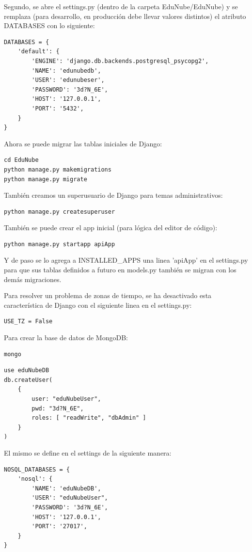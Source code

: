 Segundo, se abre el settings.py (dentro de la carpeta EduNube/EduNube) y se remplaza (para desarrollo, en producción debe llevar valores distintos) el atributo DATABASES con lo siguiente:
\lstset{language=Python}
\begin{lstlisting}
DATABASES = {
    'default': {
        'ENGINE': 'django.db.backends.postgresql_psycopg2',
        'NAME': 'edunubedb',
        'USER': 'edunubeser',
        'PASSWORD': '3d?N_6E',
        'HOST': '127.0.0.1',
        'PORT': '5432',
    }
}
\end{lstlisting}
\lstset{language=Bash}

Ahora se puede migrar las tablas iniciales de Django:
\begin{lstlisting}
cd EduNube
python manage.py makemigrations
python manage.py migrate
\end{lstlisting}

También creamos un superusuario de Django para temas administrativos:
\begin{lstlisting}
python manage.py createsuperuser
\end{lstlisting}

También se puede crear el app inicial (para lógica del editor de código):
\begin{lstlisting}
python manage.py startapp apiApp
\end{lstlisting}

Y de paso se lo agrega a INSTALLED\_APPS una linea 'apiApp' en el settings.py para que sus tablas definidos a futuro en models.py también se migran con los demás migraciones.

Para resolver un problema de zonas de tiempo, se ha desactivado esta característica de Django con el siguiente linea en el settings.py:
\lstset{language=Python}
\begin{lstlisting}
USE_TZ = False
\end{lstlisting}
\lstset{language=Bash}

Para crear la base de datos de MongoDB:
\begin{lstlisting}
mongo
\end{lstlisting}
\lstset{language=sql}
\begin{lstlisting}
use eduNubeDB
db.createUser(
    {
        user: "eduNubeUser",
        pwd: "3d?N_6E",
        roles: [ "readWrite", "dbAdmin" ]
    }
)
\end{lstlisting}
\lstset{language=Bash}

El mismo se define en el settings de la siguiente manera:
\lstset{language=Python}
\begin{lstlisting}
NOSQL_DATABASES = {
    'nosql': {
        'NAME': 'eduNubeDB',
        'USER': "eduNubeUser",
        'PASSWORD': '3d?N_6E',
        'HOST': '127.0.0.1',
        'PORT': '27017',
    }
}
\end{lstlisting}
\lstset{language=Bash}

